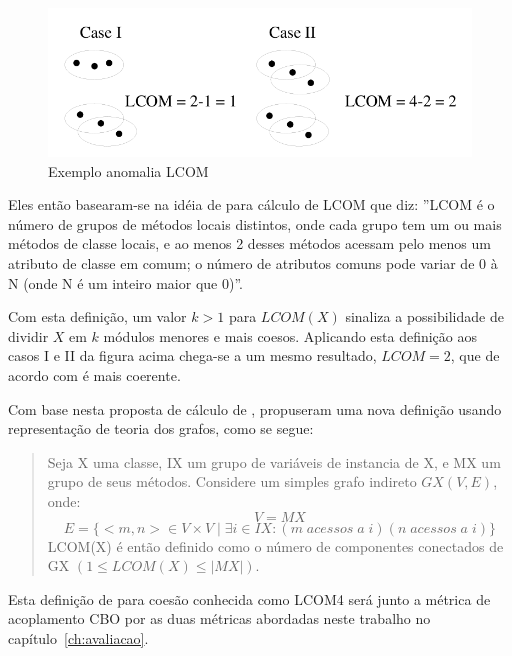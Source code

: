 \begin{figure}[h]
\center
\includegraphics[scale=0.4]{imagens/exemplo-anomalia-lcom1-hitz-e-montazeri}
\caption{Exemplo anomalia LCOM \cite{measuringCouplingAndCohesion}}
\label{fig:exemplo-anomalia-lcom1}
\end{figure}

Eles então basearam-se na idéia de
 para cálculo de LCOM que diz:
''LCOM é o número de grupos de métodos locais distintos, onde cada grupo tem um
ou mais métodos de classe locais, e ao menos 2 desses métodos acessam pelo
menos um atributo de classe em comum; o número de atributos comuns pode variar
de 0 à N (onde N é um inteiro maior que 0)''.

Com esta definição, um valor $k > 1$ para $LCOM(X)$ sinaliza a possibilidade de
dividir $X$ em $k$ módulos menores e mais coesos. Aplicando esta definição aos
casos I e II da figura acima chega-se a um mesmo resultado, $LCOM = 2$, que de
acordo com  é mais coerente.

Com base nesta proposta de cálculo de
,
 propuseram uma nova definição usando
representação de teoria dos grafos, como se segue:

\begin{quotation}
Seja X uma classe, IX um grupo de variáveis de instancia de X, e MX um grupo
de seus métodos. Considere um simples grafo indireto $GX(V, E)$, onde: $$V =
MX$$ $$E = \{<m, n> \in V \times V \mid \exists i \in IX: (m \; acessos \; a \;
i) (n \; acessos \; a \; i)\}$$ LCOM(X) é então definido como o número de componentes
conectados de GX $(1 \leq LCOM(X) \leq |MX|)$.
\end{quotation}

Esta definição de  para coesão
conhecida como LCOM4 será junto a métrica de acoplamento CBO por
 as duas métricas abordadas neste trabalho no
capítulo~\ref{ch:avaliacao}.

